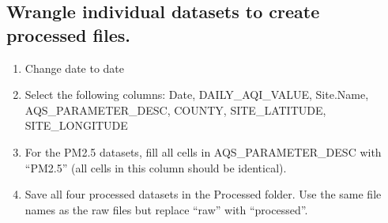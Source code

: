 \documentclass[
]{article}
\providecommand{\tightlist}{%
  \setlength{\itemsep}{0pt}\setlength{\parskip}{0pt}}
\begin{document}
\hypertarget{wrangle-individual-datasets-to-create-processed-files.}{%
\subsection{Wrangle individual datasets to create processed
files.}\label{wrangle-individual-datasets-to-create-processed-files.}}

\begin{enumerate}
\def\labelenumi{\arabic{enumi}.}
\setcounter{enumi}{2}
\tightlist
\item
  Change date to date
\item
  Select the following columns: Date, DAILY\_AQI\_VALUE, Site.Name,
  AQS\_PARAMETER\_DESC, COUNTY, SITE\_LATITUDE, SITE\_LONGITUDE
\item
  For the PM2.5 datasets, fill all cells in AQS\_PARAMETER\_DESC with
  ``PM2.5'' (all cells in this column should be identical).
\item
  Save all four processed datasets in the Processed folder. Use the same
  file names as the raw files but replace ``raw'' with ``processed''.
\end{enumerate}
\end{document}
